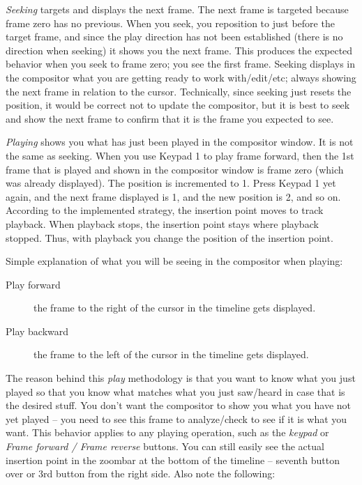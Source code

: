 \textit{Seeking} targets and displays the next frame.  The next frame is targeted because frame zero has no previous.  When you seek, you reposition to just before the target frame, and since the play direction has not been established (there is no direction when seeking) it shows you the next frame.  This produces the expected behavior when you seek to frame zero; you see the first frame.  Seeking displays in the compositor what you are getting ready to work with/edit/etc; always showing the next frame in relation to the cursor. Technically, since seeking just resets the position, it would be correct not to update the compositor, but it is best to seek and show the next frame to confirm that it is the frame you expected to see.

\textit{Playing} shows you what has just been played in the compositor window.  It is not the same as seeking. When you use Keypad 1 to play frame forward, then the 1st frame that is played and shown in the compositor window is frame zero (which was already displayed).  The position is incremented to 1.  Press Keypad 1 yet again, and the next frame displayed is 1, and the new position is 2, and so on.  According to the implemented strategy, the insertion point moves to track playback.  When playback stops, the insertion point stays where playback stopped.  Thus, with playback you change the position of the insertion point.

Simple explanation of what you will be seeing in the compositor when playing:

\begin{description}
    \item[Play forward] the frame to the right of the cursor in the timeline gets displayed.
    \item[Play backward] the frame to the left of the cursor in the timeline gets displayed.
\end{description}

The reason behind this \textit{play} methodology is that you want to know what you just played so that you know what matches what you just saw/heard in case that is the desired stuff.   You don't want the compositor to show you what you have not yet played -- you need to see this frame to analyze/check to see if it is what you want.  This behavior applies to any playing operation, such as the \textit{keypad} or \textit{Frame forward / Frame reverse} buttons.  You can still easily see the actual insertion point in the zoombar at the bottom of the timeline -- seventh button over or 3rd button from the right side.   Also note the following:

